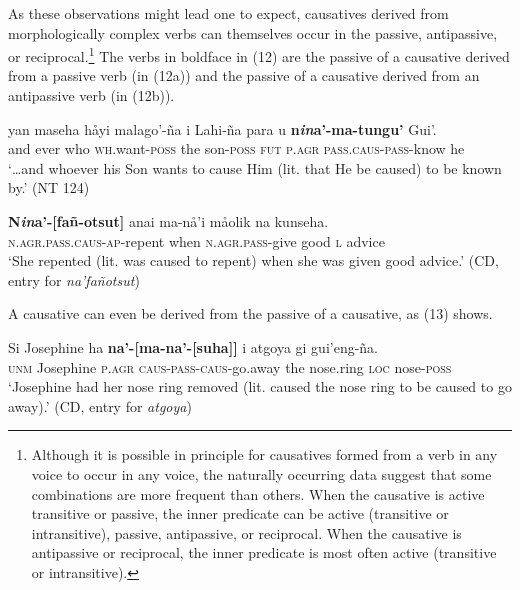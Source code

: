 \documentclass[output=paper,
modfonts
]{LSP/langsci}
\begin{document}
\begin{exe}
\begin{xlist}
As these observations might lead one to expect, causatives derived from
morphologically complex verbs can themselves occur in the passive,
antipassive, or reciprocal.\footnote{Although it is possible in
  principle for causatives formed from a verb in any voice to occur in
  any voice, the naturally occurring data suggest that some combinations
  are more frequent than others. When the causative is active transitive
  or passive, the inner predicate can be active (transitive or
  intransitive), passive, antipassive, or reciprocal. When the causative
  is antipassive or reciprocal, the inner predicate is most often active
  (transitive or intransitive).} The verbs in boldface in (12) are the
passive of a causative derived from a passive verb (in (12a)) and the
passive of a causative derived from an antipassive verb (in (12b)).

\begin{exe}
\ex \begin{xlist}
\ex
\gll  {\dots} yan maseha håyi malago'-ña i Lahi-ña para u \textbf{n\emph{in}a'-{\ob}ma-tungu'{\cb}} Gui'.\\
{ } and ever who \textsc{wh.}want-\textsc{poss} the son-\textsc{poss} \textsc{fut}
\textsc{p.agr} \textsc{pass.caus-pass-}know he\\
\glt `{\dots}and whoever his Son wants to cause Him (lit. that He be caused) to
be known by.' (NT 124)

\ex \gll \textbf{N\emph{in}a'-{[}fañ-otsut{]}} anai ma-nå'i måolik na kunseha.\\
\textsc{n.agr.pass.caus-ap-}repent when \textsc{n.agr.pass-}give good
\textsc{l} advice\\

\glt `She repented (lit. was caused to repent) when she was given good
advice.' (CD, entry for \emph{na'fañotsut})
\end{xlist}
\end{exe}

A causative can even be derived from the passive of a causative, as (13)
shows.

\begin{exe}
\ex
\gll Si Josephine ha \textbf{na'-{[}ma-na'-{[}suha{]}{]}} i atgoya gi gui'eng-ña.\\
\textsc{unm} Josephine \textsc{p.agr} \textsc{caus-pass-caus-}go.away the
nose.ring \textsc{loc} nose-\textsc{poss}\\
\glt `Josephine had her nose ring removed (lit. caused the nose ring to be
caused to go away).' (CD, entry for \emph{atgoya})
\end{exe}


\end{xlist}
\end{exe}
\end{document}

